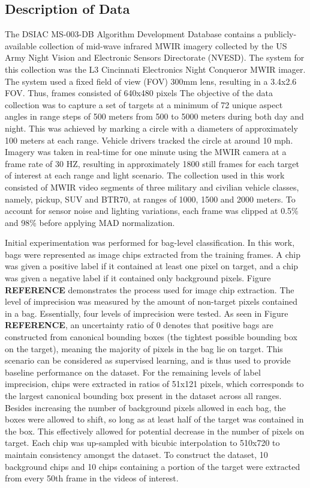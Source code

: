 \subsection{Description of Data}
The DSIAC MS-003-DB Algorithm Development Database \citep{DSIACATR} contains a publicly-available collection of mid-wave infrared MWIR imagery collected by the US Army Night Vision and Electronic Sensors Directorate (NVESD). The system for this collection was the L3 Cincinnati Electronics Night Conqueror MWIR imager. The system used a fixed field of view (FOV) 300mm lens, resulting in a 3.4x2.6 FOV.  Thus, frames consisted of 640x480 pixels  The objective of the data collection was to capture a set of targets at a minimum of 72 unique aspect angles in range steps of 500 meters from 500 to 5000 meters during both day and night.  This was achieved by marking a circle with a diameters of approximately 100 meters at each range.  Vehicle drivers tracked the circle at around 10 mph. Imagery was taken in real-time for one minute using the  MWIR camera at a frame rate of 30 HZ, resulting in approximately 1800 still frames for each target of interest at each range and light scenario.  The collection used in this work consisted of MWIR video segments of three military and civilian vehicle classes, namely, pickup, SUV and BTR70, at ranges of 1000, 1500 and 2000 meters.  To account for sensor noise and lighting variations,  each frame was clipped at 0.5\% and 98\% before applying MAD normalization.
 
Initial experimentation was performed for bag-level classification.  In this work, bags were represented as image chips extracted from the training frames.  A chip was given a positive label if it contained at least one pixel on target, and a chip was given a negative label if it contained only background pixels.   Figure \textbf{REFERENCE} demonstrates the process used for image chip extraction.  The level of imprecision was measured by the amount of non-target pixels contained in a bag.  Essentially, four levels of imprecision were tested.  As seen in Figure \textbf{REFERENCE}, an uncertainty ratio of 0 denotes that positive bags are constructed from canonical bounding boxes (the tightest possible bounding box on the target), meaning the majority of pixels in the bag lie on target.  This scenario can be considered as supervised learning, and is thus used to provide baseline performance on the dataset. For the remaining levels of label imprecision, chips were extracted in ratios of 51x121 pixels, which corresponds to the largest canonical bounding box present in the dataset across all ranges.  Besides increasing the number of background pixels allowed in each bag, the boxes were  allowed to shift, so long as at least half of the target was contained in the box.  This effectively allowed for potential decrease in the number of pixels on target.  Each chip was up-sampled with bicubic interpolation to 510x720 to maintain consistency amongst the dataset.  To construct the dataset, 10 background chips and 10 chips containing a portion of the target were extracted from every 50th frame in the videos of interest.


